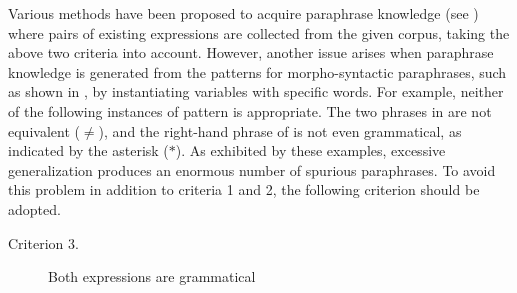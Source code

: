 \documentclass[english]{jnlp_1.4}
\begin{document}
Various methods have been proposed to acquire paraphrase knowledge
(see ) where pairs of existing expressions are
collected from the given corpus, taking the above two criteria into
account.
However, another issue arises when paraphrase knowledge is generated
from the patterns for morpho-syntactic paraphrases, such as shown in
, by instantiating variables with specific words.
For example, neither of the following instances of pattern
 is appropriate.
The two phrases in  are not equivalent ($\neq$),
and the right-hand phrase of  is not even
grammatical, as indicated by the asterisk ($\ast$).
As exhibited by these examples, excessive generalization produces an
enormous number of spurious paraphrases.  To avoid this problem in
addition to criteria 1 and 2, the following criterion should be
adopted.
\begin{description}
\item[Criterion 3.] Both expressions are grammatical
\end{description}
\end{document}
